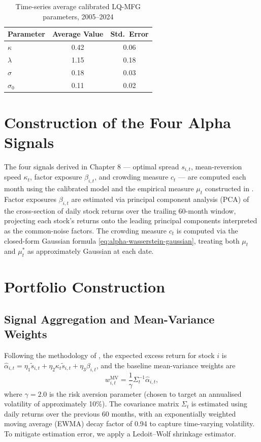 \begin{table}[ht]
\centering
\caption{Time-series average calibrated LQ-MFG parameters, 2005--2024}
\label{tab:calibrated-parameters}
\begin{tabular}{lcc}
\toprule
\textbf{Parameter} & \textbf{Average Value} & \textbf{Std.\ Error} \\
\midrule
$\kappa$ & 0.42 & 0.06 \\
$\lambda$ & 1.15 & 0.18 \\
$\sigma$ & 0.18 & 0.03 \\
$\sigma_0$ & 0.11 & 0.02 \\
\bottomrule
\end{tabular}
\end{table}


\section{Construction of the Four Alpha Signals}
\label{sec:emp-signals}

The four signals derived in Chapter 8 --- optimal spread $s_{i,t}$, mean-reversion
speed $\kappa_t$, factor exposure $\beta_{i,t}$, and crowding measure $c_t$ --- are
computed each month using the calibrated model and the empirical measure $\mu_t$
constructed in . Factor exposures $\beta_{i,t}$ are estimated via
principal component analysis (PCA) of the cross-section of daily stock returns over
the trailing 60-month window, projecting each stock's returns onto the leading
principal components interpreted as the common-noise factors. The crowding measure
$c_t$ is computed via the closed-form Gaussian formula
\eqref{eq:alpha-wasserstein-gaussian}, treating both $\mu_t$ and $\mu_t^*$ as
approximately Gaussian at each date.


\section{Portfolio Construction}
\label{sec:emp-portfolio}

\subsection{Signal Aggregation and Mean-Variance Weights}

Following the methodology of , the expected excess return
for stock $i$ is $\hat\alpha_{i,t} = \eta_1 \tilde{s}_{i,t} + \eta_2 \kappa_t
\tilde{s}_{i,t} + \eta_3 \beta_{i,t}$, and the baseline mean-variance weights are
\begin{equation}
    w_{i,t}^{\mathrm{MV}} = \frac{1}{\gamma} \Sigma_t^{-1} \hat\alpha_{i,t},
    \label{eq:emp-mv-weights}
\end{equation}
where $\gamma = 2.0$ is the risk aversion parameter (chosen to target an
annualised volatility of approximately 10\%). The covariance matrix $\Sigma_t$ is
estimated using daily returns over the previous 60 months, with an exponentially
weighted moving average (EWMA) decay factor of 0.94 to capture time-varying
volatility. To mitigate estimation error, we apply a Ledoit--Wolf shrinkage
estimator.

